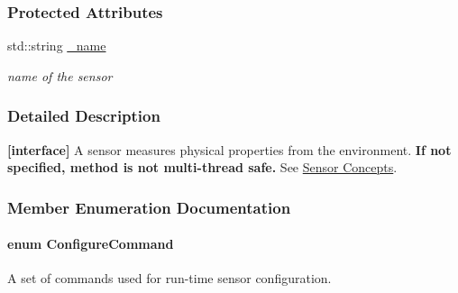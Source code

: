 \subsubsection*{Protected Attributes}
\begin{DoxyCompactItemize}
\item 
\hypertarget{classOpenRAVE_1_1SensorBase_aaf2ed934b37cbbd236fdd1b01a5f5005}{
std::string \hyperlink{classOpenRAVE_1_1SensorBase_aaf2ed934b37cbbd236fdd1b01a5f5005}{\_\-name}}
\label{classOpenRAVE_1_1SensorBase_aaf2ed934b37cbbd236fdd1b01a5f5005}

\begin{DoxyCompactList}\small\item\em name of the sensor \item\end{DoxyCompactList}\end{DoxyCompactItemize}


\subsubsection{Detailed Description}
{\bfseries \mbox{[}interface\mbox{]}} A sensor measures physical properties from the environment. {\bfseries If not specified, method is not multi-\/thread safe.} See \hyperlink{arch__sensor}{Sensor Concepts}. 

\subsubsection{Member Enumeration Documentation}
\hypertarget{classOpenRAVE_1_1SensorBase_a48dea54d66d3cd48fda033d19cad7dbc}{
\paragraph[{ConfigureCommand}]{\setlength{\rightskip}{0pt plus 5cm}enum {\bf ConfigureCommand}}\hfill}
\label{classOpenRAVE_1_1SensorBase_a48dea54d66d3cd48fda033d19cad7dbc}


A set of commands used for run-\/time sensor configuration. 

